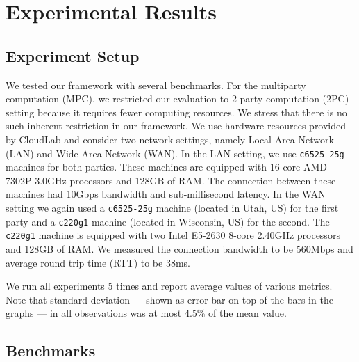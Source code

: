 \section{Experimental Results}
\label{sec:results}

\subsection{Experiment Setup}\label{sec:experiment_setup}
We tested our framework with several benchmarks. For the multiparty computation (MPC), we restricted our evaluation to 2 party computation (2PC) setting because it requires fewer computing resources. We stress that there is no such inherent restriction in our framework. We use hardware resources provided by CloudLab\cite{DuplyakinATC19} and consider two network settings, namely Local Area Network (LAN) and Wide Area Network (WAN). In the LAN setting, we use {\tt c6525-25g} machines for both parties. These machines are equipped with 16-core AMD 7302P 3.0GHz processors and 128GB of RAM. The connection between these machines had 10Gbps bandwidth and sub-millisecond latency. %
In the WAN setting we again used a {\tt c6525-25g} machine (located in Utah, US) for the first party and a {\tt c220g1} machine (located in Wisconsin, US) for the second. The {\tt c220g1} machine is equipped with two Intel E5-2630 8-core 2.40GHz processors and 128GB of RAM. We measured the connection bandwidth to be 560Mbps and average round trip time (RTT) to be 38ms. %

We run all experiments 5 times and report average values of various metrics. Note that standard deviation --- shown as error bar on top of the bars in the graphs --- in all observations was at most 4.5\% of the mean value. %

\subsection{Benchmarks}\label{sec:benchmarks_description}

